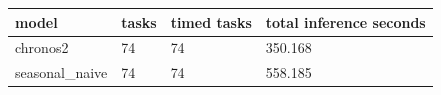 \begin{tabular}{llll}
\toprule
model & tasks & timed tasks & total inference seconds \\
\midrule
chronos2 & 74 & 74 & 350.168 \\
seasonal\_naive & 74 & 74 & 558.185 \\
\bottomrule
\end{tabular}

